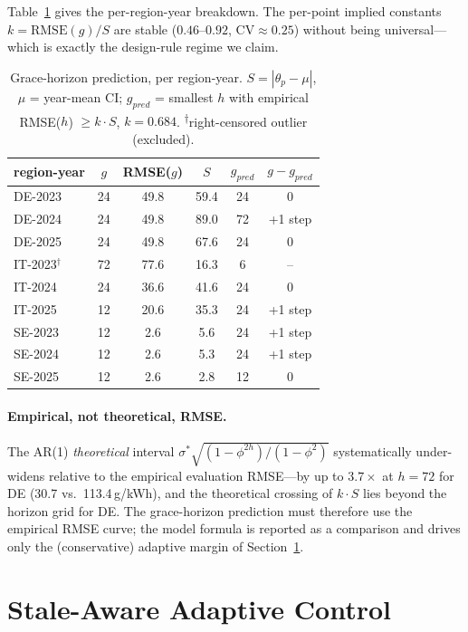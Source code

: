 \documentclass[sigconf,nonacm=false]{acmart}
\begin{document}
Table~\ref{tab:gracepred} gives the per-region-year breakdown. The per-point
implied constants $k=\mathrm{RMSE}(g)/S$ are stable ($0.46$--$0.92$,
CV$\approx0.25$) without being universal---which is exactly the design-rule
regime we claim.

\begin{table}[t]
  \caption{Grace-horizon prediction, per region-year. $S=|\theta_p-\mu|$,
  $\mu$ = year-mean CI; $g_{pred}$ = smallest $h$ with empirical RMSE($h$)
  $\ge k\cdot S$, $k{=}0.684$. \textsuperscript{$\dagger$}right-censored outlier
  (excluded).}
  \label{tab:gracepred}
  \small
  \begin{tabular}{@{}l c c c c c@{}}
    \toprule
    region-year & $g$ & RMSE($g$) & $S$ & $g_{pred}$ & $g-g_{pred}$ \\
    \midrule
    DE-2023 & 24 & 49.8 & 59.4 & 24 & 0 \\
    DE-2024 & 24 & 49.8 & 89.0 & 72 & +1 step \\
    DE-2025 & 24 & 49.8 & 67.6 & 24 & 0 \\
    IT-2023$^\dagger$ & 72 & 77.6 & 16.3 & 6 & -- \\
    IT-2024 & 24 & 36.6 & 41.6 & 24 & 0 \\
    IT-2025 & 12 & 20.6 & 35.3 & 24 & +1 step \\
    SE-2023 & 12 & 2.6 & 5.6 & 24 & +1 step \\
    SE-2024 & 12 & 2.6 & 5.3 & 24 & +1 step \\
    SE-2025 & 12 & 2.6 & 2.8 & 12 & 0 \\
    \bottomrule
  \end{tabular}
\end{table}

\paragraph{Empirical, not theoretical, RMSE.}
The AR(1) \emph{theoretical} interval $\sigma^*\sqrt{(1-\phi^{2h})/(1-\phi^2)}$
systematically under-widens relative to the empirical evaluation RMSE---by up to
$3.7\times$ at $h{=}72$ for DE (30.7 vs.\ 113.4\,g/kWh), and the theoretical
crossing of $k\cdot S$ lies beyond the horizon grid for DE. The grace-horizon
prediction must therefore use the empirical RMSE curve; the model formula is
reported as a comparison and drives only the (conservative) adaptive margin of
Section~\ref{sec:adaptive}.

\section{Stale-Aware Adaptive Control}
\label{sec:adaptive}
\end{document}
